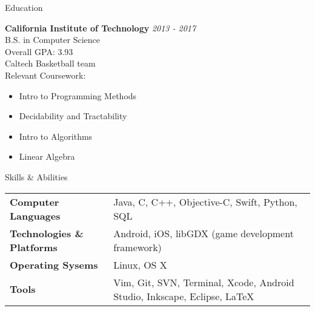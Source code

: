 \documentclass{resume} %
\begin{document}

\begin{rSection}{Education}

{\bf California Institute of Technology} \hfill {\em 2013 - 2017} \\
B.S. in Computer Science \smallskip \\
Overall GPA: 3.93 \\
Caltech Basketball team \\
Relevant Coursework:
\vspace{-5.0mm}
\begin{minipage}{0.4\linewidth}
\begin{itemize}
\item{Intro to Programming Methods}
\item{Decidability and Tractability}
\end{itemize}
\end{minipage}
\begin{minipage}{0.4\linewidth}
\begin{itemize}
\item{Intro to Algorithms}
\item{Linear Algebra}
\end{itemize}
\end{minipage}
\vspace{5mm}
\end{rSection}


\begin{rSection}{Skills \& Abilities}

\begin{tabularx}{\textwidth}{@{}lX}
    \bfseries{Computer Languages}   &  Java, C, C++, Objective-C, Swift, Python,
    SQL \\
    \bfseries{Technologies \& Platforms}   &  Android, iOS, libGDX (game development
    framework) \\
    \bfseries{Operating Sysems}   &  Linux, OS X \\
    \bfseries{Tools}   &  Vim, Git, SVN, Terminal, Xcode, Android Studio, Inkscape,
    Eclipse, \LaTeX \\
\end{tabularx}

\end{rSection}
\end{document}
